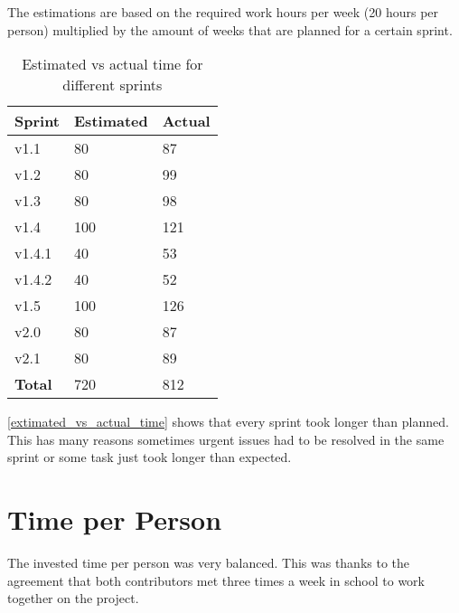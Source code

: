 The estimations are based on the required work hours per week (20 hours per person) multiplied by the amount of weeks that are planned for a certain sprint.

\begin{table}[H]
\centering
    \begin{tabular}{lll}
    \textbf{Sprint}        & \textbf{Estimated} & \textbf{Actual} \\
     \hline
    v1.1    & 80     & 87        \\
    v1.2    & 80     & 99        \\
    v1.3    & 80     & 98        \\
    v1.4    & 100    & 121       \\
    v1.4.1  & 40     & 53       \\
    v1.4.2  & 40     & 52       \\
    v1.5    & 100    & 126       \\
    v2.0    & 80     & 87        \\
    v2.1    & 80     & 89        \\
    \hline
    \textbf{Total} & 720 & 812   \\
    \end{tabular}
    \caption{Estimated vs actual time for different sprints}
    \label{extimated_vs_actual_time}
\end{table}

\autoref{extimated_vs_actual_time} shows that every sprint took longer than planned. This has many reasons sometimes urgent issues had to be resolved in the same sprint or some task just took longer than expected.

\section{Time per Person}

The invested time per person was very balanced. This was thanks to the agreement that both contributors met three times a week in school to work together on the project. 

